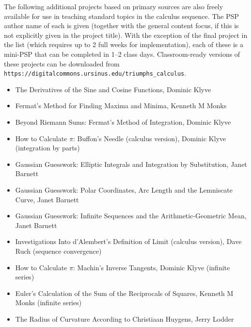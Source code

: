 \documentclass[11pt]{article}
\begin{document}
 \vspace*{-3pt}
 
 
The following additional projects based on primary sources are also freely available for use in teaching standard topics in the calculus sequence. The PSP author name of each is given (together with the general content focus, if this is not explicitly given in the project title). With the exception of the final project in the list (which requires up to 2 full weeks for implementation), each of these is a mini-PSP that can be completed in 1--2 class days. Classroom-ready versions of these projects can be downloaded from  {\tt  https://digitalcommons.ursinus.edu/triumphs\_calculus}.





\begin{itemize}
\item  The Derivatives of the Sine and Cosine Functions, Dominic Klyve 


\item Fermat's Method for Finding Maxima and Minima, Kenneth M Monks
\item Beyond Riemann Sums: Fermat's Method of Integration, Dominic Klyve



\item How to Calculate $\pi$: Buffon's Needle (calculus version), Dominic Klyve (integration by parts)


  \item Gaussian Guesswork: Elliptic Integrals and Integration by Substitution, Janet  Barnett


\item Gaussian Guesswork: Polar Coordinates, Arc Length and the Lemniscate Curve, Janet  Barnett

\item Gaussian Guesswork: Infinite Sequences and the Arithmetic-Geometric Mean, Janet  Barnett

\item Investigations Into d'Alembert's Definition of Limit (calculus version), Dave Ruch (sequence convergence)

\item How to Calculate $\pi$: Machin's Inverse Tangents, Dominic Klyve (infinite series)


 \item  Euler's Calculation of the Sum of the Reciprocals of Squares, Kenneth M Monks (infinite series)

 \item The Radius of Curvature According to Christiaan Huygens, Jerry Lodder
\end{itemize}
\end{document}

